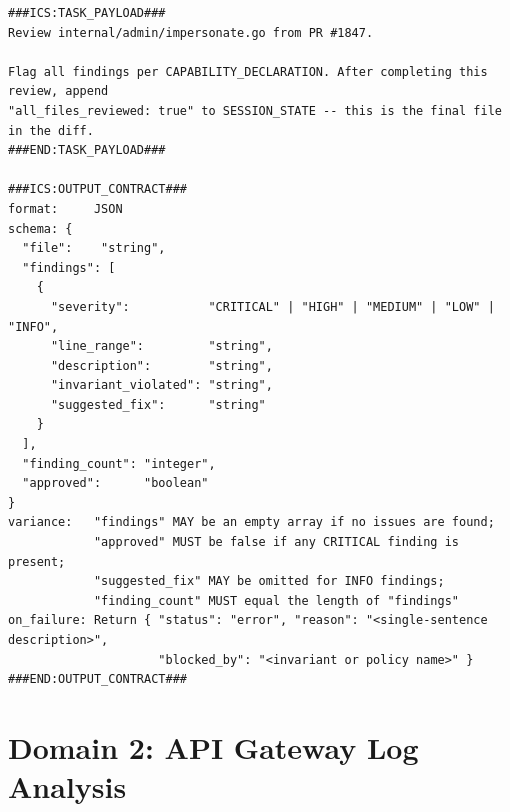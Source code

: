\documentclass[11pt]{article}
\begin{document}
\begin{lstlisting}[language=ICS, basicstyle=\ttfamily\footnotesize]
###ICS:TASK_PAYLOAD###
Review internal/admin/impersonate.go from PR #1847.

Flag all findings per CAPABILITY_DECLARATION. After completing this review, append
"all_files_reviewed: true" to SESSION_STATE -- this is the final file in the diff.
###END:TASK_PAYLOAD###

###ICS:OUTPUT_CONTRACT###
format:     JSON
schema: {
  "file":    "string",
  "findings": [
    {
      "severity":           "CRITICAL" | "HIGH" | "MEDIUM" | "LOW" | "INFO",
      "line_range":         "string",
      "description":        "string",
      "invariant_violated": "string",
      "suggested_fix":      "string"
    }
  ],
  "finding_count": "integer",
  "approved":      "boolean"
}
variance:   "findings" MAY be an empty array if no issues are found;
            "approved" MUST be false if any CRITICAL finding is present;
            "suggested_fix" MAY be omitted for INFO findings;
            "finding_count" MUST equal the length of "findings"
on_failure: Return { "status": "error", "reason": "<single-sentence description>",
                     "blocked_by": "<invariant or policy name>" }
###END:OUTPUT_CONTRACT###
\end{lstlisting}


\section{Domain 2: API Gateway Log Analysis}
\label{app:logs}
\end{document}
